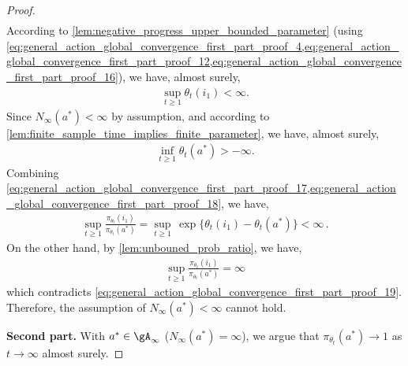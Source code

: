 \begin{proof}
\begin{align}
\end{align}
According to \cref{lem:negative_progress_upper_bounded_parameter} (using \cref{eq:general_action_global_convergence_first_part_proof_4,eq:general_action_global_convergence_first_part_proof_12,eq:general_action_global_convergence_first_part_proof_16}), we have, almost surely,
\begin{align}
\label{eq:general_action_global_convergence_first_part_proof_17}
    \sup_{t \ge 1}{ \theta_t(i_1) } < \infty.
\end{align}
Since $N_\infty(a^*) < \infty$ by assumption, and according to \cref{lem:finite_sample_time_implies_finite_parameter}, we have, almost surely, 
\begin{align}
\label{eq:general_action_global_convergence_first_part_proof_18}
    \inf_{t \ge 1}{ \theta_t(a^*)} > -\infty.
\end{align}
Combining \cref{eq:general_action_global_convergence_first_part_proof_17,eq:general_action_global_convergence_first_part_proof_18}, we have,
\begin{align}
\label{eq:general_action_global_convergence_first_part_proof_19}
    \sup_{t \ge 1}{ \frac{\pi_{\theta_t}(i_1)}{\pi_{\theta_t}(a^*)} } = \sup_{t \ge 1} \, \exp\{ \theta_t(i_1) - \theta_t(a^*) \}  < \infty \,.
\end{align}
On the other hand, by \cref{lem:unbouned_prob_ratio}, we have,
\begin{align}
\label{eq:general_action_global_convergence_first_part_proof_20}
    \sup_{t \ge 1}{ \frac{\pi_{\theta_t}(i_1)}{\pi_{\theta_t}(a^*)} } = \infty
\end{align}
which contradicts \cref{eq:general_action_global_convergence_first_part_proof_19}. Therefore, the assumption of $N_\infty(a^*) < \infty$ cannot hold.

\textbf{Second part.} With $a^* \in \gA_\infty$ ($N_\infty(a^*) =  \infty$), we argue that $\pi_{\theta_t}(a^*) \to 1$ as $t \to \infty$ almost surely.



\end{proof}
